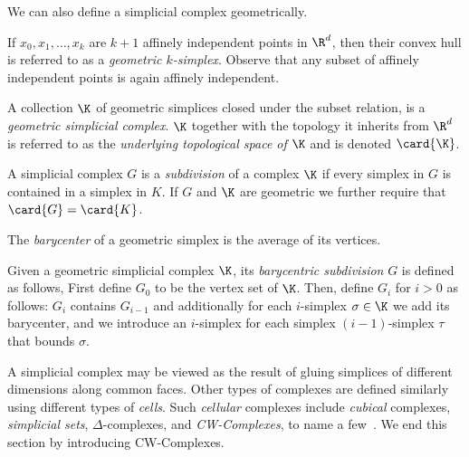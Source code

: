 We can also define a simplicial complex geometrically. 
\begin{definition}
If $x_0, x_1, \ldots, x_k$ are $k+1$ affinely independent points in $\R^d$, then their convex hull is referred to as a \emph{geometric $k$-simplex}. Observe that any subset of affinely independent points is again affinely independent. 
\end{definition}
\begin{definition}
A collection $\K$ of geometric simplices closed under the subset relation, is a \emph{geometric simplicial complex}. $\K$ together with the topology it inherits from $\R^d$ is referred to as the \emph{underlying topological space of $\K$} and is denoted $\card{\K}$. 
\end{definition}
\begin{definition}[Subdivision]
A simplicial complex $G$ is a \emph{subdivision} of a complex $\K$ if every simplex in $G$ is contained in a simplex in $K$. If $G$ and $\K$ are geometric we further require that $\card{G} = \card{K}$.
\end{definition}
\begin{definition}[Barycenter]
The \emph{barycenter} of a geometric simplex is the average of its vertices.
\end{definition}
\begin{definition}
Given a geometric simplicial complex $\K$, its \emph{barycentric subdivision} $G$ is defined as follows, First define $G_0$ to be the vertex set of $\K$. Then, define $G_i$ for $i > 0$ as follows: $G_i$ contains $G_{i-1}$ and additionally for each $i$-simplex $\sigma  \in \K$ we add its barycenter, and we introduce an $i$-simplex for each simplex $(i-1)$-simplex $\tau$ that bounds $\sigma$.
\end{definition}

A simplicial complex may be viewed as the result of gluing simplices of 
different dimensions along common faces. Other types of complexes are defined 
similarly using different types of \emph{cells}. Such \emph{cellular} complexes include \emph{cubical} complexes, \emph{simplicial sets}, $\Delta$-complexes, and \emph{CW-Complexes}, 
to name a few~\cite{ez-ssc-50,hatcher,kmm-ch-04,m-soat-68}. We end this section by introducing CW-Complexes.

